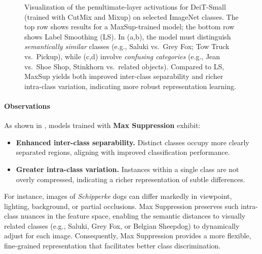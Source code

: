 \begin{figure*}[ht]
   \caption{Visualization of the penultimate-layer activations for DeiT-Small (trained with CutMix and Mixup) on selected ImageNet classes. 
The top row shows results for a MaxSup-trained model; 
the bottom row shows Label Smoothing (LS). 
In (a,b), the model must distinguish \textit{semantically similar} classes (e.g., Saluki vs.\ Grey Fox; Tow Truck vs.\ Pickup), 
while (c,d) involve \textit{confusing categories} (e.g., Jean vs.\ Shoe Shop, Stinkhorn vs.\ related objects). Compared to LS, MaxSup yields both improved inter-class separability and richer intra-class variation, indicating more robust representation learning.}
    \label{fig:comparison1}
\end{figure*}

\paragraph{Observations}
As shown in , models trained with \textbf{Max Suppression} exhibit:
\begin{itemize}
    \item \textbf{Enhanced inter-class separability.} Distinct classes occupy more clearly separated regions, aligning with improved classification performance.
    \item \textbf{Greater intra-class variation.} Instances within a single class are not overly compressed, indicating a richer representation of subtle differences.
\end{itemize}

For instance, images of \emph{Schipperke} dogs can differ markedly in viewpoint, lighting, background, or partial occlusions. Max Suppression preserves such intra-class nuances in the feature space, enabling the semantic distances to visually related classes (e.g., Saluki, Grey Fox, or Belgian Sheepdog) to dynamically adjust for each image. Consequently, Max Suppression provides a more flexible, fine-grained representation that facilitates better class discrimination.

